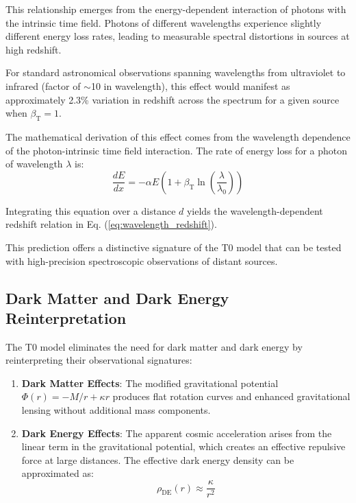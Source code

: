 \documentclass[12pt,a4paper]{article} %
\newcommand{\betaT}{\beta_{\text{T}}}
\begin{document}
	This relationship emerges from the energy-dependent interaction
	of photons with the intrinsic time field. 
	Photons of different wavelengths experience slightly different energy loss rates,
	leading to measurable spectral distortions in sources at high redshift.
	
	For standard astronomical observations
	spanning wavelengths from ultraviolet to infrared
	(factor of $\sim$10 in wavelength),
	this effect would manifest as approximately 2.3\% variation in redshift
	across the spectrum for a given source when $\betaT = 1$.
	
	The mathematical derivation of this effect
	comes from the wavelength dependence of the photon-intrinsic time field interaction. 
	The rate of energy loss for a photon of wavelength $\lambda$ is:
	\begin{equation}
		\frac{dE}{dx} = -\alpha E\left(1 + \betaT\ln\left(\frac{\lambda}{\lambda_0}\right)\right)
		\label{eq:energy_loss_rate}
	\end{equation}
	
	Integrating this equation over a distance $d$
	yields the wavelength-dependent redshift relation
	in Eq. (\ref{eq:wavelength_redshift}).
	
	This prediction offers a distinctive signature of the T0 model
	that can be tested with high-precision spectroscopic observations
	of distant sources.
	
	\subsection{Dark Matter and Dark Energy Reinterpretation}
	\label{subsec:dark_reinterpretation}
	
	The T0 model eliminates the need for dark matter and dark energy
	by reinterpreting their observational signatures:
	\begin{enumerate}
		\item \textbf{Dark Matter Effects}:
		The modified gravitational potential
		$\Phi(r) = -M/r + \kappa r$
		produces flat rotation curves and enhanced gravitational lensing
		without additional mass components.
		\item \textbf{Dark Energy Effects}:
		The apparent cosmic acceleration arises from the linear term
		in the gravitational potential,
		which creates an effective repulsive force at large distances. 
		The effective dark energy density can be approximated as:
		\begin{equation}
			\rho_{\text{DE}}(r) \approx \frac{\kappa}{r^2}
			\label{eq:effective_dark_energy}
		\end{equation}
	\end{enumerate}
	
\end{document}
